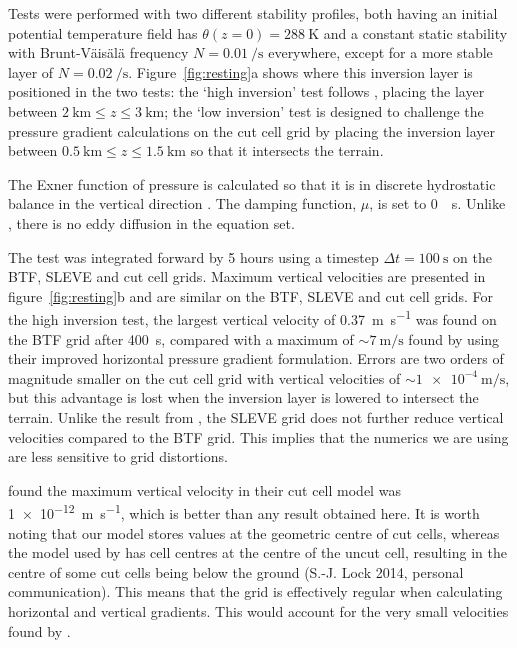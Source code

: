 \documentclass{ametsoc}
\begin{document}
Tests were performed with two different stability profiles, both having an initial potential temperature field has $\theta(z = 0) = \SI{288}{\kelvin}$ and a constant static stability with Brunt-V\"ais\"al\"a frequency $N = \SI{0.01}{\per\second}$ everywhere, except for a more stable layer of $N = \SI{0.02}{\per\second}$.
Figure~\ref{fig:resting}a shows where this inversion layer is positioned in the two tests: the `high inversion' test follows \citet{klemp2011}, placing the layer between $\SI{2}{\kilo\meter} \leq z \leq \SI{3}{\kilo\meter}$; the `low inversion' test is designed to challenge the pressure gradient calculations on the cut cell grid by placing the inversion layer between $\SI{0.5}{\kilo\meter} \leq z \leq \SI{1.5}{\kilo\meter}$ so that it intersects the terrain.

The Exner function of pressure is calculated so that it is in discrete hydrostatic balance in the vertical direction \citep{weller-shahrokhi2014}.  The damping function, \(\mu\), is set to \SI{0}{\per\second}.  Unlike \citet{klemp2011}, there is no eddy diffusion in the equation set.

The test was integrated forward by 5 hours using a timestep $\Delta t = \SI{100}{\second}$ on the BTF, SLEVE and cut cell grids.
Maximum vertical velocities are presented in figure~\ref{fig:resting}b and are similar on the BTF, SLEVE and cut cell grids.  For the high inversion test, the largest vertical velocity of \SI{0.37}{\meter\per\second} was found on the BTF grid after \SI{400}{\second}, compared with a maximum of \(\sim \SI{7}{\meter\per\second}\) found by \citet{klemp2011} using their improved horizontal pressure gradient formulation.
Errors are two orders of magnitude smaller on the cut cell grid with vertical velocities of \(\sim \SI{1e-4}{\meter\per\second}\), but this advantage is lost when the inversion layer is lowered to intersect the terrain.
Unlike the result from \citet{klemp2011}, the SLEVE grid does not further reduce vertical velocities compared to the BTF grid.  This implies that the numerics we are using are less sensitive to grid distortions.

\citet{good2014} found the maximum vertical velocity in their cut cell model was \SI{1e-12}{\meter\per\second}, which is better than any result obtained here.  It is worth noting that our model stores values at the geometric centre of cut cells, whereas the model used by \citet{good2014} has cell centres at the centre of the uncut cell, resulting in the centre of some cut cells being below the ground (S.-J. Lock 2014, personal communication).  This means that the grid is effectively regular when calculating horizontal and vertical gradients.  This would account for the very small velocities found by \citet{good2014}.
\end{document}
